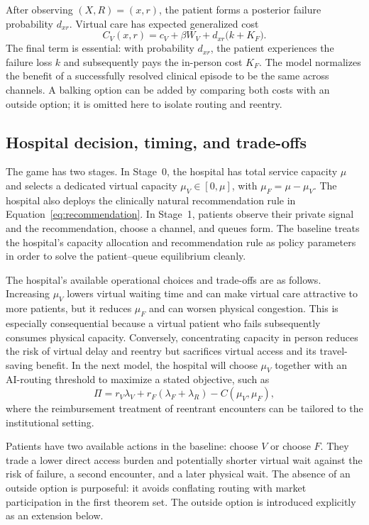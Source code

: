 \documentclass[11pt]{article}
\begin{document}
After observing $(X,R)=(x,r)$, the patient forms a posterior failure probability $d_{xr}$.  Virtual care has expected generalized cost
\begin{equation}
 C_V(x,r)=c_V+\beta W_V+d_{xr}\big(k+K_F\big).
 \label{eq:virtualcost}
\end{equation}
The final term is essential: with probability $d_{xr}$, the patient experiences the failure loss $k$ and subsequently pays the in-person cost $K_F$.  The model normalizes the benefit of a successfully resolved clinical episode to be the same across channels.  A balking option can be added by comparing both costs with an outside option; it is omitted here to isolate routing and reentry.

\subsection{Hospital decision, timing, and trade-offs}

The game has two stages.  In Stage~0, the hospital has total service capacity $\mu$ and selects a dedicated virtual capacity $\mu_V\in[0,\mu]$, with $\mu_F=\mu-\mu_V$.  The hospital also deploys the clinically natural recommendation rule in Equation~\eqref{eq:recommendation}.  In Stage~1, patients observe their private signal and the recommendation, choose a channel, and queues form.  The baseline treats the hospital's capacity allocation and recommendation rule as policy parameters in order to solve the patient--queue equilibrium cleanly.

The hospital's available operational choices and trade-offs are as follows.  Increasing $\mu_V$ lowers virtual waiting time and can make virtual care attractive to more patients, but it reduces $\mu_F$ and can worsen physical congestion.  This is especially consequential because a virtual patient who fails subsequently consumes physical capacity.  Conversely, concentrating capacity in person reduces the risk of virtual delay and reentry but sacrifices virtual access and its travel-saving benefit.  In the next model, the hospital will choose $\mu_V$ together with an AI-routing threshold to maximize a stated objective, such as
\[
 \Pi=r_V\lambda_V+r_F(\lambda_F+\lambda_R)-C(\mu_V,\mu_F),
\]
where the reimbursement treatment of reentrant encounters can be tailored to the institutional setting.

Patients have two available actions in the baseline: choose $V$ or choose $F$.  They trade a lower direct access burden and potentially shorter virtual wait against the risk of failure, a second encounter, and a later physical wait.  The absence of an outside option is purposeful: it avoids conflating routing with market participation in the first theorem set.  The outside option is introduced explicitly as an extension below.
\end{document}
